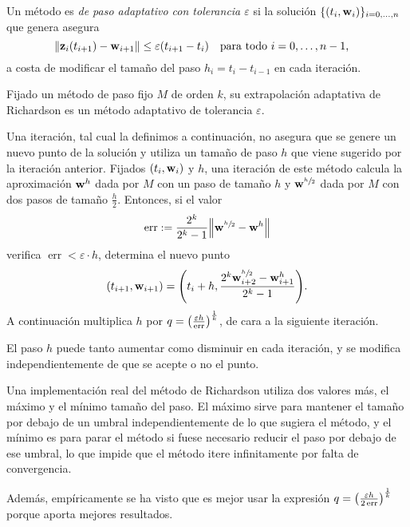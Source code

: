 \begin{definition}
    Un método es \emph{de paso adaptativo con tolerancia $\varepsilon$}
    si la solución $\{(t_i, \vb{w}{}_i)\}_{i = 0,\ldots,n}$ que genera asegura
    \begin{equation*}
        \norm{\vz_i(t_{i+1}) - \vw_{i+1}} \le \varepsilon (t_{i+1} - t_i)
            \qq{para todo $i = 0,\ldots,n-1$,}
    \end{equation*}
    a costa de modificar el tamaño del paso $h_i = t_i - t_{i-1}$
    en cada iteración.
\end{definition}

\begin{method}
    Fijado un método de paso fijo $M$ de orden $k$,
    su extrapolación adaptativa de Richardson
    es un método adaptativo de tolerancia $\varepsilon$.

    Una iteración, tal cual la definimos a continuación,
    no asegura que se genere un nuevo punto de la solución y
    utiliza un tamaño de paso $h$ que viene sugerido por la iteración anterior.
    Fijados $(t_i, \vb{w}{}_i)$ y $h$,
    una iteración de este método
    calcula la aproximación $\vb{w}{}^h$ dada por $M$ con un paso de tamaño $h$
    y $\vb{w}{}^{\sfrac{h}{2}}$ dada por $M$ con dos pasos de tamaño $\frac{h}{2}$.
    Entonces, si el valor
    \begin{equation*}
        \operatorname{err} := \frac{2^k}{2^k-1}\norm{\vb{w}{}^{\sfrac{h}{2}} - \vb{w}{}^h}
    \end{equation*}
    verifica $\operatorname{err} < \varepsilon\cdot h$,
    determina el nuevo punto
    \begin{equation*}
        (t_{i+1}, \vb{w}{}_{i+1}) = \qty(
            t_i + h, \frac{2^k\vb{w}{}^{\sfrac{h}{2}}_{i+2} - \vb{w}{}^h_{i+1}}{2^k - 1}
        ).
    \end{equation*}
    A continuación multiplica $h$ por
    $q = \qty(\frac{\varepsilon h}{\operatorname{err}})^{\frac{1}{k}}$,
    de cara a la siguiente iteración.
\end{method}

\begin{remark}
    El paso $h$ puede tanto aumentar como disminuir en cada iteración,
    y se modifica independientemente de que se acepte o no el punto.
\end{remark}

\begin{remark}
    Una implementación real del método de Richardson
    utiliza dos valores más,
    el máximo y el mínimo tamaño del paso.
    El máximo sirve para mantener el tamaño por debajo de un umbral
    independientemente de lo que sugiera el método,
    y el mínimo es para parar el método si fuese necesario reducir el paso
    por debajo de ese umbral,
    lo que impide que el método itere infinitamente por falta de convergencia.

    Además, empíricamente se ha visto que es mejor usar la expresión
    $q = \qty(\frac{\varepsilon h}{2\operatorname{err}})^{\frac{1}{k}}$
    porque aporta mejores resultados.
\end{remark}
    
